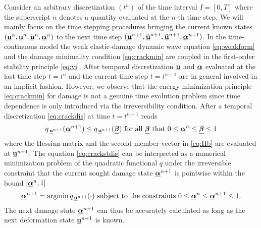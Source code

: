 Consider an arbitrary discretization $(t^n)$ of the time interval $I=[0,T]$ where the superscript $n$ denotes a quantity evaluated at the $n$-th time step. We will mainly focus on the time stepping procedures bringing the current known states $(\uvec^n,\dot{\uvec}^n,\ddot{\uvec}^n,\dvec^n)$ to the next time step $(\uvec^{n+1},\dot{\uvec}^{n+1},\ddot{\uvec}^{n+1},\dvec^{n+1})$. In the time-continuous model the weak elastic-damage dynamic wave equation \eqref{eq:weakform} and the damage minimality condition \eqref{eq:crackmin} are coupled in the first-order stability principle \eqref{eq:vi}. After temporal discretization $\uvec$ and $\dvec$ evaluated at the last time step $t=t^n$ and the current time step $t=t^{n+1}$ are in general involved in an implicit fashion. However, we observe that the energy minimization principle \eqref{eq:crackmin} for damage is not a genuine time evolution problem since time dependence is only introduced via the irreversibility condition. After a temporal discretization \eqref{eq:crackdis} at time $t=t^{n+1}$ reads
\begin{equation} \label{eq:crackstdis}
q_{\,\uvec^{n+1}}(\dvec^{n+1})\leq q_{\,\uvec^{n+1}}(\underline{\vec{\beta}}) \text{ for all $\underline{\vec{\beta}}$ that $0\leq\dvec^n\leq\underline{\vec{\beta}}\leq 1$}
\end{equation}
where the Hessian matrix and the second member vector in \eqref{eq:Hb} are evaluated at $\uvec^{n+1}$. The equation \eqref{eq:crackstdis} can be interpreted as a numerical minimization problem of the quadratic functional $q$ under the irreversible constraint that the current sought damage state $\dvec^{n+1}$ is pointwise within the bound $[\dvec^n,1]$
\begin{equation} \label{eq:cracknummin}
\dvec^{n+1}=\operatorname{arg min}q_{\,\uvec^{n+1}}(\cdot)\text{ subject to the constraints $0\leq\dvec^n\leq\dvec^{n+1}\leq 1$}.
\end{equation}
The next damage state $\dvec^{n+1}$ can thus be accurately calculated as long as the next deformation state $\uvec^{n+1}$ is known.

